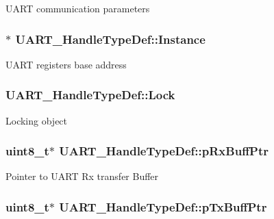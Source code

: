 U\-A\-R\-T communication parameters \hypertarget{struct_u_a_r_t___handle_type_def_a02df2e8e2b4d929d5e1b5b96566a9fb6}{
\subsubsection[{Instance}]{$\ast$ U\-A\-R\-T\-\_\-\-Handle\-Type\-Def\-::\-Instance}}\label{struct_u_a_r_t___handle_type_def_a02df2e8e2b4d929d5e1b5b96566a9fb6}
U\-A\-R\-T registers base address \hypertarget{struct_u_a_r_t___handle_type_def_acf20ded14a90f4f8053abb7ad61c62b0}{
\subsubsection[{Lock}]{ U\-A\-R\-T\-\_\-\-Handle\-Type\-Def\-::\-Lock}}\label{struct_u_a_r_t___handle_type_def_acf20ded14a90f4f8053abb7ad61c62b0}
Locking object \hypertarget{struct_u_a_r_t___handle_type_def_a9541d846ad12e9376ddd0062efe3196c}{
\subsubsection[{p\-Rx\-Buff\-Ptr}]{\setlength{\rightskip}{0pt plus 5cm}uint8\-\_\-t$\ast$ U\-A\-R\-T\-\_\-\-Handle\-Type\-Def\-::p\-Rx\-Buff\-Ptr}}\label{struct_u_a_r_t___handle_type_def_a9541d846ad12e9376ddd0062efe3196c}
Pointer to U\-A\-R\-T Rx transfer Buffer \hypertarget{struct_u_a_r_t___handle_type_def_a79dd401b02d57f1b2d4618744402850c}{
\subsubsection[{p\-Tx\-Buff\-Ptr}]{\setlength{\rightskip}{0pt plus 5cm}uint8\-\_\-t$\ast$ U\-A\-R\-T\-\_\-\-Handle\-Type\-Def\-::p\-Tx\-Buff\-Ptr}}\label{struct_u_a_r_t___handle_type_def_a79dd401b02d57f1b2d4618744402850c}
